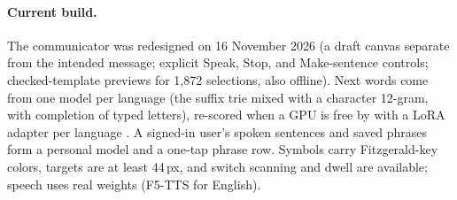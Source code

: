 \paragraph{Current build.}
The communicator was redesigned on 16 November 2026 (a draft canvas separate from the intended message; explicit Speak, Stop, and Make-sentence controls; checked-template previews for 1,872 selections, also offline).
Next words come from one model per language (the suffix trie mixed with a character 12-gram, with completion of typed letters), re-scored when a GPU is free by \bloom{} \citep{bigscience2022bloom} with a LoRA adapter per language \citep{hu2022lora}.
A signed-in user's spoken sentences and saved phrases form a personal model and a one-tap phrase row.
Symbols carry Fitzgerald-key colors, targets are at least 44\,px, and switch scanning and dwell are available; speech uses real \indicf{} weights (F5-TTS for English).
